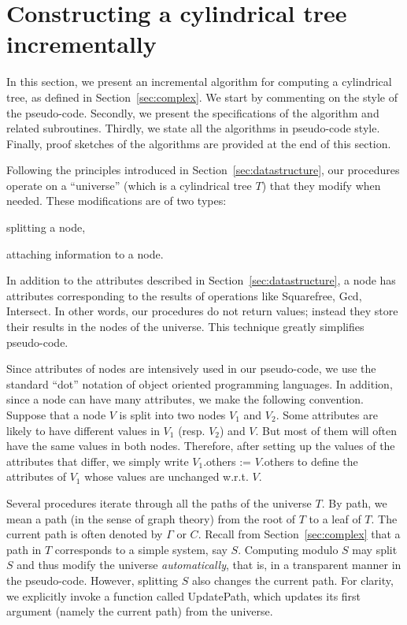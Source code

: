 \documentclass[10pt]{article}
\begin{document}
\section{Constructing a cylindrical tree incrementally}
\label{sec:incremental}

In this section, we present an incremental algorithm
for computing a cylindrical tree, as defined in Section~\ref{sec:complex}.
We start by commenting on the style of the pseudo-code.
Secondly, we present the specifications of the algorithm
and related subroutines. 
Thirdly, we state all the algorithms in pseudo-code style. 
Finally, proof sketches of the algorithms are provided at the end of
this section.

Following the principles introduced in Section~\ref{sec:datastructure},
our procedures operate on a ``universe'' (which is a
cylindrical tree $T$) that they modify when needed.
These modifications are of two types:
\begin{itemizeshort}
\item splitting a node,
\item attaching information to a node.
\end{itemizeshort}
In addition to the attributes described in Section~\ref{sec:datastructure},
a node has attributes corresponding to the results of operations
like {\sf Squarefree}, {\sf Gcd}, {\sf Intersect}.
In other words, our procedures
do not return values; instead they store their
results in the nodes of the universe.
This technique greatly simplifies pseudo-code.

Since attributes of nodes are intensively used
in our pseudo-code, we use the standard ``dot''
notation of object oriented programming languages.
In addition, since a node can have many attributes,
we make the following convention.
Suppose that a node $V$ is split into two nodes
$V_1$ and $V_2$.
Some attributes are likely
to have  different values in  $V_1$ (resp. $V_2$)
and $V$. But most of them will often have
the same values in both nodes.
Therefore, after setting up the values of the
attributes that differ, we simply write
$V_1$.others := $V$.others
to define the attributes of $V_1$ whose values are unchanged
w.r.t. $V$.

Several procedures iterate through all the paths of the universe $T$.
By path, we mean a path (in the sense of graph theory)
from the root of $T$ to a leaf of $T$.
The current path is often denoted by $\Gamma$ or $C$.
Recall from Section~\ref{sec:complex} 
that a path in $T$ corresponds to a simple system, say $S$.
Computing modulo $S$ may split $S$ and thus modify the universe {\em automatically},
that is, in a transparent manner in the pseudo-code.
However, splitting $S$ also changes the current path.
For clarity, we explicitly invoke a function called {\sf UpdatePath},
which updates its first argument (namely the current path) from the universe.
\end{document}

